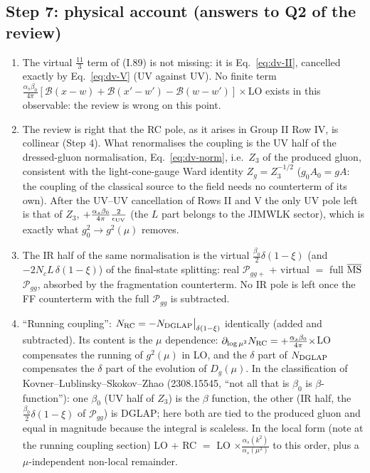 {\subsection*{Step 7: physical account (answers to Q2 of the review)}
\begin{enumerate}
\item The virtual $\frac{11}{3}$ term of (I.89) is not missing: it is Eq.~\eqref{eq:dv-II}, cancelled exactly by Eq.~\eqref{eq:dv-V} (UV against UV). No finite term $\frac{\alpha_{s}\beta_{0}}{4\pi}[\mathcal{B}(x-w)+\mathcal{B}(x'-w')-\mathcal{B}(w-w')]\times$LO exists in this observable: the review is wrong on this point.
\item The review is right that the RC pole, as it arises in Group II Row IV, is collinear (Step 4). What renormalises the coupling is the UV half of the dressed-gluon normalisation, Eq.~\eqref{eq:dv-norm}, i.e.\ $Z_{3}$ of the produced gluon, consistent with the light-cone-gauge Ward identity $Z_{g}=Z_{3}^{-1/2}$ ($g_{0}A_{0}=gA$: the coupling of the classical source to the field needs no counterterm of its own). After the UV--UV cancellation of Rows II and V the only UV pole left is that of $Z_{3}$, $+\frac{\alpha_{s}\beta_{0}}{4\pi}\frac{2}{\epsilon_{\rm UV}}$ (the $L$ part belongs to the JIMWLK sector), which is exactly what $g_{0}^{2}\to g^{2}(\mu)$ removes.
\item The IR half of the same normalisation is the virtual $\frac{\beta_{0}}{2}\delta(1-\xi)$ (and $-2N_{c}L\,\delta(1-\xi)$) of the final-state splitting: real $\mathcal{P}_{gg+}$ $+$ virtual $=$ full $\overline{\rm MS}$ $\mathcal{P}_{gg}$, absorbed by the fragmentation counterterm. No IR pole is left once the FF counterterm with the full $\mathcal{P}_{gg}$ is subtracted.
\item ``Running coupling'': $N_{\rm RC}=-N_{\rm DGLAP}\big|_{\delta(1-\xi)}$ identically (added and subtracted). Its content is the $\mu$ dependence: $\partial_{\log\mu^{2}}N_{\rm RC}=+\frac{\alpha_{s}\beta_{0}}{4\pi}\times$LO compensates the running of $g^{2}(\mu)$ in LO, and the $\delta$ part of $N_{\rm DGLAP}$ compensates the $\delta$ part of the evolution of $D_{g}(\mu)$. In the classification of Kovner--Lublinsky--Skokov--Zhao (2308.15545, ``not all that is $\beta_{0}$ is $\beta$-function''): one $\beta_{0}$ (UV half of $Z_{3}$) is the $\beta$ function, the other (IR half, the $\frac{\beta_{0}}{2}\delta(1-\xi)$ of $\mathcal{P}_{gg}$) is DGLAP; here both are tied to the produced gluon and equal in magnitude because the integral is scaleless. In the local form (note at the running coupling section) LO $+$ RC $=$ LO $\times\frac{\alpha_{s}(k^{2})}{\alpha_{s}(\mu^{2})}$ to this order, plus a $\mu$-independent non-local remainder.
\end{enumerate}
}\par
